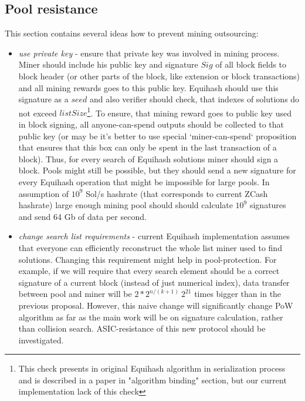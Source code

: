 \subsection{Pool resistance}

This section contains several ideas how to prevent mining outsourcing:

\begin{itemize}
    \item{\em use private key } - ensure that private key was involved in mining process.
    Miner should include his public key and signature $Sig$ of all block fields to block header
    (or other parts of the block, like extension or block transactions)
    and all mining rewards goes to this public key.
    Equihash should use this signature as a $seed$ and also verifier should check, that indexes of solutions do
    not exceed $listSize$\footnote{This check presents in original Equihash algorithm in serialization process
    and is described in a paper in "algorithm binding" section, but our current implementation lack of this check}.
    To ensure, that mining reward goes to public key used in block signing, all anyone-can-spend outputs should
    be collected to that public key (or may be it's better to use special `miner-can-spend` proposition
    that ensures that this box can only be spent in the last transaction of a block).
    Thus, for every search of Equihash solutions miner should sign a block.
    Pools might still be possible, but they should send a new signature for every Equihash operation that might
    be impossible for large pools. In assumption of $10^9$ Sol/s hashrate (that corresponds to current ZCash
    hashrate) large enough mining pool should should calculate $10^9$ signatures and send 64 Gb of data per second.

    \item{\em change search list requirements} - current Equihash implementation assumes that everyone can efficiently
    reconstruct the whole list miner used to find solutions. Changing this requirement might help in pool-protection.
    For example, if we will require that every search element should be a correct signature of a current block
    (instead of just numerical index), data transfer between pool and miner will be $2*2^{n / (k + 1)}~2^21$ times
    bigger than in the previous proposal.
    However, this naive change will significantly change PoW algorithm as far as the main work will be
    on signature calculation, rather than collision search.
    ASIC-resistance of this new protocol should be investigated.


\end{itemize}
